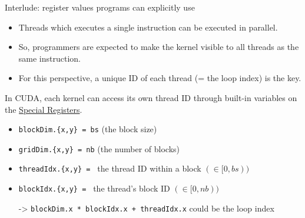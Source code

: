 \documentclass[dvipdfmx, 11pt, aspectratio=169]{beamer}   %
\begin{document}
\begin{frame}[fragile]{Interlude: register values programs can explicitly use}
\begin{itemize}
  \item Threads which executes a single instruction can be executed in parallel.
  \item So, programmers are expected to make the kernel visible to all threads as the same instruction.
  \item For this perspective, a unique ID of each thread (= the loop index) is the key.
\end{itemize}
In CUDA, each kernel can access its own thread ID through built-in variables on the \href{https://docs.nvidia.com/cuda/parallel-thread-execution/#special-registers}{Special Registers}.
\begin{itemize}
  \item \lstinline|blockDim.{x,y} = bs| (the block size)
  \item \lstinline|gridDim.{x,y} = nb| (the number of blocks)
  \item \lstinline|threadIdx.{x,y} = | the thread ID within a block $(\in [0, bs))$
  \item \lstinline|blockIdx.{x,y} = | the thread's block ID $(\in [0, nb))$
  \item[->] \lstinline|blockDim.x * blockIdx.x + threadIdx.x| could be the loop index
\end{itemize}
\end{frame}
\end{document}
